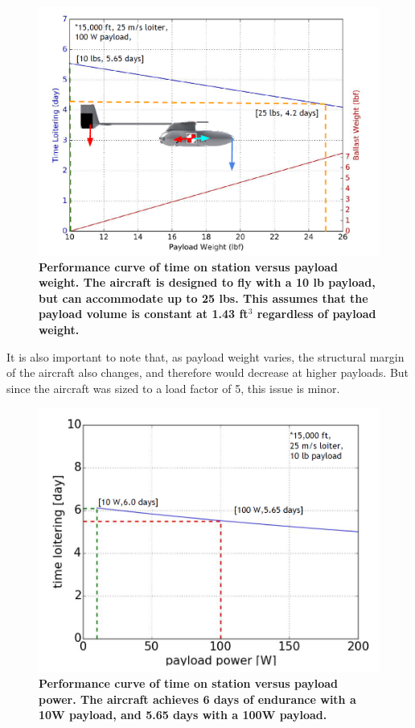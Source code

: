 \documentclass[journal]{aiaa-tc}%
\begin{document}
\begin{figure}[htbp!]
    \begin{center}
    \includegraphics[width = .65\textwidth]{tvsw_pay}
     \caption{ \textbf{Performance curve of time on station versus payload weight.  The aircraft is designed to fly with a 10 lb payload, but can accommodate up to 25 lbs. This assumes that the payload volume is constant at 1.43 ft$^3$ regardless of payload weight. } }
    \label{f:tvsw_pay}
    \end{center}
\end{figure}

It is also important to note that, as payload weight varies, the structural margin of the aircraft also changes, and therefore would decrease at higher payloads. But since the aircraft was sized to a load factor of 5, this issue is minor.

\begin{figure}[!htbp]
    \begin{center}
    \includegraphics[width = .65\textwidth]{ppay_vs_tstation}
     \caption{ \textbf{Performance curve of time on station versus payload power. The aircraft achieves 6 days of endurance with a 10W payload, and 5.65 days with a 100W payload.} }
    \label{f:tvsP_pay}
    \end{center}
\end{figure}
\end{document}
